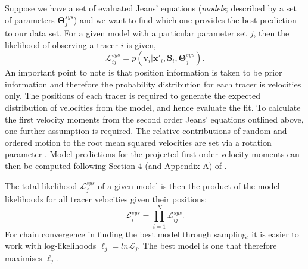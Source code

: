 Suppose we have a set of evaluated Jeans' equations (\textit{models}; described by a set of parameters $\boldsymbol{\Theta}^{sys}_{j}$) and we want to find which one provides the best prediction to our data set. For a given model with a particular parameter set $j$, then the likelihood of observing a tracer $i$ is given, 
\begin{equation}
\mathcal{L}^{sys}_{ij} = p (\boldsymbol{v}_{i}|\boldsymbol{x}'_{i},\boldsymbol{S}_{i},\boldsymbol{\Theta}^{sys}_{j}).
\end{equation}
An important point to note is that position information is taken to be prior information and therefore the probability distribution for each tracer is velocities only. The positions of each tracer is required to generate the expected distribution of velocities from the model, and hence evaluate the fit. To calculate the first velocity moments from the second order Jeans' equations outlined above, one further assumption is required. The relative contributions of random and ordered motion to the root mean squared velocities are set via a rotation parameter \citep[see Equation 22 in][]{watkins2013}. Model predictions for the projected first order velocity moments can then be computed following Section 4 (and Appendix A) of \citet{watkins2013}.

The total likelihood $\mathcal{L}^{sys}_{j}$ of a given model is then the product of the model likelihoods for all tracer velocities given their positions:
\begin{equation}
\mathcal{L}^{sys}_{i} = \prod^{N}_{i=1} \mathcal{L}^{sys}_{ij}.
\end{equation}
For chain convergence in finding the best model through sampling, it is easier to work with log-likelihoods $\ell_j = ln\mathcal{L}_{j}$. The best model is one that therefore maximises $\ell_j$. 

